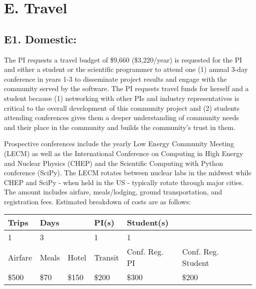 \documentclass[11pt,oneside]{memoir}
\begin{document}
\section*{E. Travel}

\subsection{E1. Domestic:}
The PI requests a travel budget of \$9,660 (\$3,220/year) is requested for the PI and either a student or the scientific programmer to attend one (1) annual 3-day conference in years 1-3 to disseminate project results and engage with the community served by the software. The PI requests travel funds for herself and a student because (1) networking with other PIs and industry representatives is critical to the overall development of this community project and (2) students attending conferences gives them a deeper understanding of community needs and their place in the community and builds the community's trust in them.

Prospective conferences include the yearly Low Energy Community Meeting (LECM) as well as the International Conference on Computing in High Energy and Nuclear Physics (CHEP) and the Scientific Computing with Python conference (SciPy).  The LECM rotates between nuclear labs in the midwest while CHEP and SciPy - when held in the US - typically rotate through major cities.  The amount includes airfare, meals/lodging, ground transportation, and registration fees. Estimated breakdown of costs are as follows:


\begin{minipage}{\linewidth}
    \centering
    \begin{tabular}{ llllll } 
    \toprule
     Trips & Days & & PI(s) & Student(s) & \\
     \midrule
     1 & 3 & & 1 & 1 &  \\ 
     \addlinespace[1ex]
     Airfare & Meals & Hotel & Transit & Conf. Reg. PI & Conf. Reg. Student\\ 
     \midrule
     \$500 & \$70 & \$150 & \$200 & \$300 & \$200 \\ 
     \bottomrule
   \end{tabular}
     \label{tab:title} 
\end{minipage}
    
\end{document}

